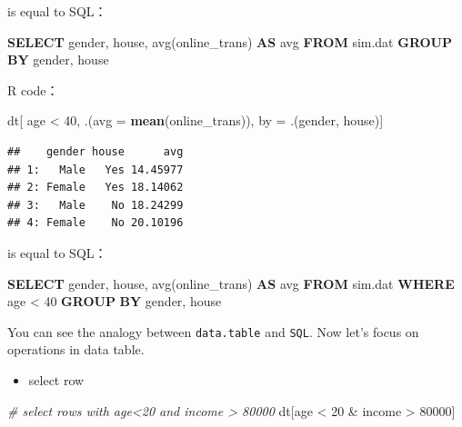 \documentclass[]{book}
\newenvironment{Shaded}{\begin{snugshade}}{\end{snugshade}}
\newcommand{\KeywordTok}[1]{\textcolor[rgb]{0.13,0.29,0.53}{\textbf{{#1}}}}
\newcommand{\DataTypeTok}[1]{\textcolor[rgb]{0.13,0.29,0.53}{{#1}}}
\newcommand{\DecValTok}[1]{\textcolor[rgb]{0.00,0.00,0.81}{{#1}}}
\newcommand{\StringTok}[1]{\textcolor[rgb]{0.31,0.60,0.02}{{#1}}}
\newcommand{\CommentTok}[1]{\textcolor[rgb]{0.56,0.35,0.01}{\textit{{#1}}}}
\newcommand{\FunctionTok}[1]{\textcolor[rgb]{0.00,0.00,0.00}{{#1}}}
\newcommand{\NormalTok}[1]{{#1}}
\providecommand{\tightlist}{%
  \setlength{\itemsep}{0pt}\setlength{\parskip}{0pt}}
\theoremstyle{definition}
\theoremstyle{definition}
\theoremstyle{remark}
\begin{document}
is equal to SQL：

\begin{Shaded}
\begin{Highlighting}[]
\KeywordTok{SELECT} \NormalTok{gender, house, }\FunctionTok{avg}\NormalTok{(online_trans) }\KeywordTok{AS} \FunctionTok{avg} \KeywordTok{FROM} \NormalTok{sim.dat }\KeywordTok{GROUP} \KeywordTok{BY} \NormalTok{gender, house}
\end{Highlighting}
\end{Shaded}

R code：

\begin{Shaded}
\begin{Highlighting}[]
\NormalTok{dt[ age <}\StringTok{ }\DecValTok{40}\NormalTok{, .(}\DataTypeTok{avg =} \KeywordTok{mean}\NormalTok{(online_trans)), by =}\StringTok{ }\NormalTok{.(gender, house)]}
\end{Highlighting}
\end{Shaded}

\begin{verbatim}
##    gender house      avg
## 1:   Male   Yes 14.45977
## 2: Female   Yes 18.14062
## 3:   Male    No 18.24299
## 4: Female    No 20.10196
\end{verbatim}

is equal to SQL：

\begin{Shaded}
\begin{Highlighting}[]
\KeywordTok{SELECT} \NormalTok{gender, house, }\FunctionTok{avg}\NormalTok{(online_trans) }\KeywordTok{AS} \FunctionTok{avg} \KeywordTok{FROM} \NormalTok{sim.dat }\KeywordTok{WHERE} \NormalTok{age < }\DecValTok{40} \KeywordTok{GROUP} \KeywordTok{BY} \NormalTok{gender, house}
\end{Highlighting}
\end{Shaded}

You can see the analogy between \texttt{data.table} and \texttt{SQL}.
Now let's focus on operations in data table.

\begin{itemize}
\tightlist
\item
  select row
\end{itemize}

\begin{Shaded}
\begin{Highlighting}[]
\CommentTok{# select rows with age<20 and income > 80000}
\NormalTok{dt[age <}\StringTok{ }\DecValTok{20} \NormalTok{&}\StringTok{ }\NormalTok{income >}\StringTok{ }\DecValTok{80000}\NormalTok{]}
\end{Highlighting}
\end{Shaded}
\end{document}
